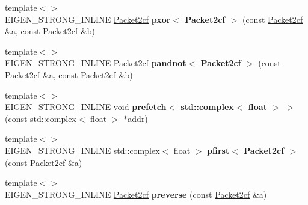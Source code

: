\begin{DoxyCompactItemize}
\item 
\mbox{\label{namespace_eigen_1_1internal_ac660b421549e38784d5c494241161443}} 
{\footnotesize template$<$$>$ }\\E\+I\+G\+E\+N\+\_\+\+S\+T\+R\+O\+N\+G\+\_\+\+I\+N\+L\+I\+NE \hyperlink{struct_eigen_1_1internal_1_1_packet2cf}{Packet2cf} {\bfseries pxor$<$ Packet2cf $>$} (const \hyperlink{struct_eigen_1_1internal_1_1_packet2cf}{Packet2cf} \&a, const \hyperlink{struct_eigen_1_1internal_1_1_packet2cf}{Packet2cf} \&b)
\item 
\mbox{\label{namespace_eigen_1_1internal_a2907d155591bf6553fdbf268569ec745}} 
{\footnotesize template$<$$>$ }\\E\+I\+G\+E\+N\+\_\+\+S\+T\+R\+O\+N\+G\+\_\+\+I\+N\+L\+I\+NE \hyperlink{struct_eigen_1_1internal_1_1_packet2cf}{Packet2cf} {\bfseries pandnot$<$ Packet2cf $>$} (const \hyperlink{struct_eigen_1_1internal_1_1_packet2cf}{Packet2cf} \&a, const \hyperlink{struct_eigen_1_1internal_1_1_packet2cf}{Packet2cf} \&b)
\item 
\mbox{\label{namespace_eigen_1_1internal_a85be7a77d836921a903a39877c42ac87}} 
{\footnotesize template$<$$>$ }\\E\+I\+G\+E\+N\+\_\+\+S\+T\+R\+O\+N\+G\+\_\+\+I\+N\+L\+I\+NE void {\bfseries prefetch$<$ std\+::complex$<$ float $>$ $>$} (const std\+::complex$<$ float $>$ $\ast$addr)
\item 
\mbox{\label{namespace_eigen_1_1internal_a609f47036c3284e339a274a95c29256a}} 
{\footnotesize template$<$$>$ }\\E\+I\+G\+E\+N\+\_\+\+S\+T\+R\+O\+N\+G\+\_\+\+I\+N\+L\+I\+NE std\+::complex$<$ float $>$ {\bfseries pfirst$<$ Packet2cf $>$} (const \hyperlink{struct_eigen_1_1internal_1_1_packet2cf}{Packet2cf} \&a)
\item 
\mbox{\label{namespace_eigen_1_1internal_a6f2a4f141d591a6b416ef718ef75909c}} 
{\footnotesize template$<$$>$ }\\E\+I\+G\+E\+N\+\_\+\+S\+T\+R\+O\+N\+G\+\_\+\+I\+N\+L\+I\+NE \hyperlink{struct_eigen_1_1internal_1_1_packet2cf}{Packet2cf} {\bfseries preverse} (const \hyperlink{struct_eigen_1_1internal_1_1_packet2cf}{Packet2cf} \&a)
\item 

\end{DoxyCompactItemize}
